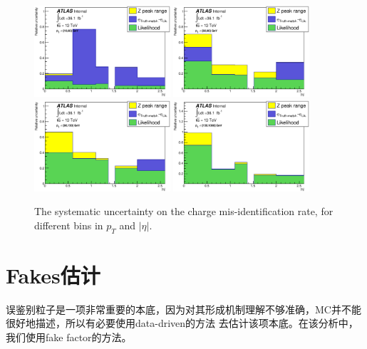 \begin{figure}[h]
\centering
  \includegraphics[width=0.45\textwidth]{fig/QmisID/Syst1_tight.eps}
  \includegraphics[width=0.45\textwidth]{fig/QmisID/Syst2_tight.eps}
  \includegraphics[width=0.45\textwidth]{fig/QmisID/Syst3_tight.eps}
  \includegraphics[width=0.45\textwidth]{fig/QmisID/Syst4_tight.eps}
\caption{The systematic uncertainty on the charge mis-identification rate, for different bins in $p_T$ and $|\eta|$.}
\label{fig:QmisID_syst}
\end{figure}

\section{Fakes估计}
误鉴别粒子是一项非常重要的本底，因为对其形成机制理解不够准确，MC并不能很好地描述，所以有必要使用data-driven的方法
去估计该项本底。在该分析中，我们使用fake factor的方法。

